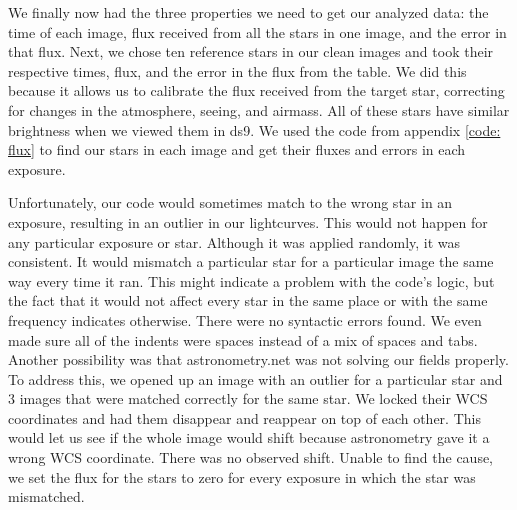 \documentclass{aastex61}
\begin{document}
We finally now had the three properties we need to get our analyzed data: the time of each image, flux received from all the stars in one image, and the error in that flux. Next, we chose ten reference stars in our clean images and took their respective times, flux, and the error in the flux from the table. We did this because it allows us to calibrate the flux received from the target star, correcting for changes in the atmosphere, seeing, and airmass. All of these stars have similar brightness when we viewed them in ds9. We used the code from appendix \ref{code: flux} to find our stars in each image and get their fluxes and errors in each exposure. 

Unfortunately, our code would sometimes match to the wrong star in an exposure, resulting in an outlier in our lightcurves. This would not happen for any particular exposure or star. Although it was applied randomly, it was consistent. It would mismatch a particular star for a particular image the same way every time it ran. This might indicate a problem with the code's logic, but the fact that it would not affect every star in the same place or with the same frequency indicates otherwise. There were no syntactic errors found. We even made sure all of the indents were spaces instead of a mix of spaces and tabs. Another possibility was that astronometry.net was not solving our fields properly. To address this, we opened up an image with an outlier for a particular star and 3 images that were matched correctly for the same star. We locked their WCS coordinates and had them disappear and reappear on top of each other. This would let us see if the whole image would shift because astronometry gave it a wrong WCS coordinate. There was no observed shift. Unable to find the cause, we set the flux for the stars to zero for every exposure in which the star was mismatched. 
\end{document}
